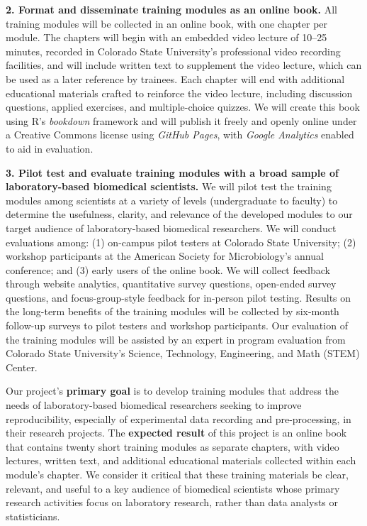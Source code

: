 \documentclass[pdftex,english,11.5pt,parskip=half]{scrartcl}
\begin{document}
\textbf{2. Format and disseminate training modules as an online book.} All training modules 
will be collected in an online book, with one chapter per module. The chapters will begin with 
an embedded video lecture of 10--25 minutes, recorded in Colorado State University's 
professional video recording facilities, and will include written text to supplement 
the video lecture, which can be used as a later reference by trainees. Each chapter will end with additional educational materials crafted to reinforce the video lecture, including discussion questions, applied exercises, and multiple-choice quizzes. We will create this book using R's \textit{bookdown} framework and will publish it freely and openly online under a Creative Commons license using \textit{GitHub Pages}, with \textit{Google Analytics} enabled to aid in evaluation. 

\textbf{3. Pilot test and evaluate training modules with a broad sample of laboratory-based
biomedical scientists.} We will pilot test the training modules among scientists at a variety of levels (undergraduate to faculty) to determine the usefulness, clarity, and relevance of the developed modules to our target audience of laboratory-based biomedical researchers. We will conduct evaluations among: (1) on-campus pilot testers at Colorado State University; (2) workshop participants at the American Society for Microbiology's annual conference; and (3) early users of the online book. We will collect feedback through website analytics, quantitative survey questions, open-ended survey questions, and focus-group-style feedback for in-person pilot testing. Results on the long-term benefits of the training modules will be collected by six-month follow-up surveys to pilot testers and workshop participants. Our evaluation of the training modules will be assisted by an expert in program evaluation from Colorado State University's Science, Technology, Engineering, and Math (STEM) Center. 

Our project's \textbf{primary goal} is to develop
training modules that address the needs of laboratory-based biomedical
researchers seeking to improve reproducibility, especially of experimental data
recording and pre-processing, in their research projects. The \textbf{expected result} of
this project is an online book that contains twenty short training modules as separate
chapters, with video lectures, written text, and additional educational
materials collected within each module's chapter. We consider it critical that
these training materials be clear, relevant, and useful to a key audience of
biomedical scientists whose primary research activities focus on laboratory
research, rather than data analysts or statisticians. 
\end{document}
